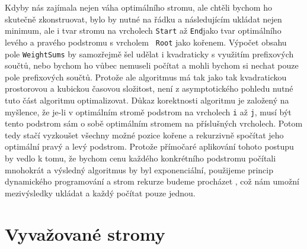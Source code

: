 
Kdyby nás zajímala nejen váha optimálního stromu, ale chtěli bychom ho skutečně
zkonstruovat, bylo by nutné na řádku  a
následujícím ukládat nejen minimum, ale i tvar stromu na vrcholech {\tt Start}
až {\tt End}jako tvar optimálního levého a pravého podstromu s vrcholem {\tt
Root} jako kořenem. Výpočet obsahu pole {\tt WeightSums} by samozřejmě šel
udělat i kvadraticky s využitím prefixových součtů, nebo bychom ho vůbec
nemuseli počítat a mohli bychom si nechat pouze pole prefixových součtů.
Protože ale algoritmus má tak jako tak kvadratickou prostorovou a kubickou
časovou složitost, není z asymptotického pohledu nutné tuto část algoritmu
optimalizovat. Důkaz korektnosti algoritmu je založený na myšlence, že je-li v
optimálním stromě podstrom na vrcholech {\tt i} až {\tt j}, musí být tento
podstrom sám o sobě optimálním stromem na příslušných vrcholech. Potom tedy
stačí vyzkoušet všechny možné pozice kořene a rekurzivně spočítat jeho
optimální pravý a levý podstrom. Protože přímočaré aplikování tohoto postupu by
vedlo k tomu, že bychom cenu každého konkrétního podstromu počítali mnohokrát a
výsledný algoritmus by byl exponenciální, použijeme princip dynamického
programování a strom rekurze budeme procházet , což nám umožní
mezivýsledky ukládat a každý počítat pouze jednou.   

\section{Vyvažované stromy}

